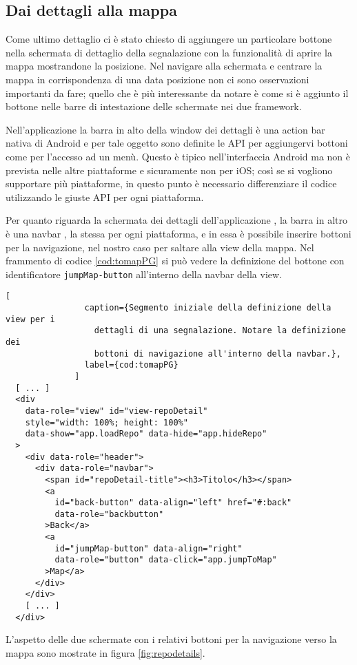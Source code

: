         \subsection{Dai dettagli alla mappa}
            Come ultimo dettaglio ci è stato chiesto di aggiungere un
            particolare bottone nella schermata di dettaglio della segnalazione
            con la funzionalità di aprire la mappa mostrandone la
            posizione. Nel navigare alla schermata e centrare la mappa in
            corrispondenza di una data posizione non ci sono osservazioni
            importanti da fare; quello che è più interessante da notare è come
            si è aggiunto il bottone nelle barre di intestazione delle schermate
            nei due framework.

            Nell'applicazione \tisdk{} la barra in alto della window dei
            dettagli è una action bar nativa di Android e per tale oggetto sono
            definite le API per aggiungervi bottoni come per l'accesso ad un
            menù. Questo è tipico nell'interfaccia Android ma non è prevista
            nelle altre piattaforme e sicuramente non per iOS; così se si
            vogliono supportare più piattaforme, in questo punto è necessario
            differenziare il codice utilizzando le giuste API per ogni
            piattaforma.

            Per quanto riguarda la schermata dei dettagli dell'applicazione
            \pg{}, la barra in altro è una navbar \kendomob{}, la stessa per
            ogni piattaforma, e in essa è possibile inserire bottoni per la
            navigazione, nel nostro caso per saltare alla view della mappa. Nel
            frammento di codice \ref{cod:tomapPG} si può vedere la definizione
            del bottone con identificatore \texttt{jumpMap-button} all'interno
            della navbar della view.
            \begin{lstlisting}[
                caption={Segmento iniziale della definizione della view per i
                  dettagli di una segnalazione. Notare la definizione dei
                  bottoni di navigazione all'interno della navbar.},
                label={cod:tomapPG}
              ]
  [ ... ]
  <div
    data-role="view" id="view-repoDetail"
    style="width: 100%; height: 100%"
    data-show="app.loadRepo" data-hide="app.hideRepo"
  >
    <div data-role="header">
      <div data-role="navbar">
        <span id="repoDetail-title"><h3>Titolo</h3></span>
        <a
          id="back-button" data-align="left" href="#:back"
          data-role="backbutton"
        >Back</a>
        <a
          id="jumpMap-button" data-align="right"
          data-role="button" data-click="app.jumpToMap"
        >Map</a>
      </div>
    </div>
    [ ... ]
  </div>
            \end{lstlisting}

            L'aspetto delle due schermate con i relativi bottoni per la
            navigazione verso la mappa sono mostrate in figura
            \ref{fig:repodetails}.
